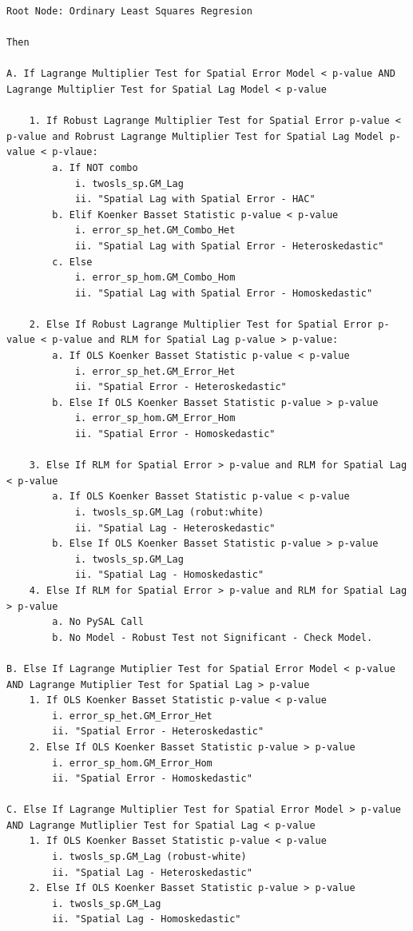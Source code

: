 \documentclass[usepdftitle=false,professionalfonts,compress ]{beamer}
\begin{document}
\begin{frame}[fragile,shrink=28]
\begin{tiny}
\begin{verbatim}
Root Node: Ordinary Least Squares Regresion

Then

A. If Lagrange Multiplier Test for Spatial Error Model < p-value AND Lagrange Multiplier Test for Spatial Lag Model < p-value

    1. If Robust Lagrange Multiplier Test for Spatial Error p-value < p-value and Robrust Lagrange Multiplier Test for Spatial Lag Model p-value < p-vlaue:
        a. If NOT combo
            i. twosls_sp.GM_Lag
            ii. "Spatial Lag with Spatial Error - HAC"
        b. Elif Koenker Basset Statistic p-value < p-value
            i. error_sp_het.GM_Combo_Het
            ii. "Spatial Lag with Spatial Error - Heteroskedastic"
        c. Else
            i. error_sp_hom.GM_Combo_Hom
            ii. "Spatial Lag with Spatial Error - Homoskedastic"
    
    2. Else If Robust Lagrange Multiplier Test for Spatial Error p-value < p-value and RLM for Spatial Lag p-value > p-value:
        a. If OLS Koenker Basset Statistic p-value < p-value
            i. error_sp_het.GM_Error_Het
            ii. "Spatial Error - Heteroskedastic"
        b. Else If OLS Koenker Basset Statistic p-value > p-value
            i. error_sp_hom.GM_Error_Hom
            ii. "Spatial Error - Homoskedastic"

    3. Else If RLM for Spatial Error > p-value and RLM for Spatial Lag < p-value 
        a. If OLS Koenker Basset Statistic p-value < p-value
            i. twosls_sp.GM_Lag (robut:white)
            ii. "Spatial Lag - Heteroskedastic"
        b. Else If OLS Koenker Basset Statistic p-value > p-value
            i. twosls_sp.GM_Lag
            ii. "Spatial Lag - Homoskedastic"
    4. Else If RLM for Spatial Error > p-value and RLM for Spatial Lag > p-value
        a. No PySAL Call
        b. No Model - Robust Test not Significant - Check Model.  

B. Else If Lagrange Mutiplier Test for Spatial Error Model < p-value AND Lagrange Mutiplier Test for Spatial Lag > p-value
    1. If OLS Koenker Basset Statistic p-value < p-value
        i. error_sp_het.GM_Error_Het
        ii. "Spatial Error - Heteroskedastic"
    2. Else If OLS Koenker Basset Statistic p-value > p-value
        i. error_sp_hom.GM_Error_Hom
        ii. "Spatial Error - Homoskedastic"

C. Else If Lagrange Multiplier Test for Spatial Error Model > p-value AND Lagrange Mutliplier Test for Spatial Lag < p-value
    1. If OLS Koenker Basset Statistic p-value < p-value
        i. twosls_sp.GM_Lag (robust-white)
        ii. "Spatial Lag - Heteroskedastic"
    2. Else If OLS Koenker Basset Statistic p-value > p-value
        i. twosls_sp.GM_Lag
        ii. "Spatial Lag - Homoskedastic"


\end{verbatim}
\end{tiny}
\end{frame}
\end{document}
